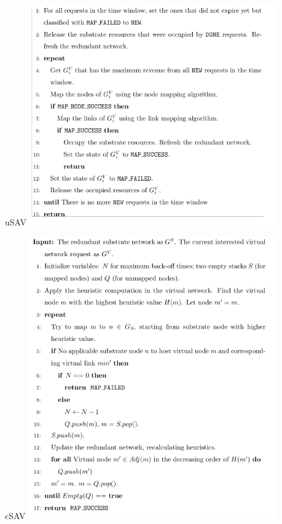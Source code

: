 \documentclass{lni}
\begin{document}
\begin{center}
uSAV\newline
	\includegraphics[width=0.8\textwidth]{usav.pdf}\newline
\end{center}
\newpage
\begin{center}
cSAV\newline
	\includegraphics[width=0.8\textwidth]{csav.pdf}\newline
\end{center}
\newpage
\end{document}
